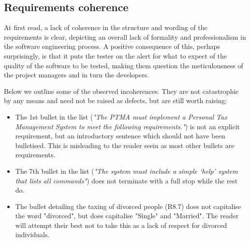 \subsection{Requirements coherence}
At first read, a lack of coherence in the structure and wording of the requirements is clear, depicting an overall lack of formality and professionalism in the software engineering process. 
A positive consequence of this, perhaps surprisingly, is that it puts the tester on the alert for what to expect of the quality of the software to be tested, making them question the meticulousness of the project managers and in turn the developers.
\par
Below we outline some of the observed incoherences. They are not catastrophic by any means and need not be raised as defects, but are still worth raising:
\begin{itemize}
	\item The 1st bullet in the list (\textit{"The PTMA must implement a Personal Tax Management System to meet the following requirements."}) is not an explicit requirement, but an introductory sentence which should not have been bulletised. This is misleading to the reader seein as most other bullets are requirements. 
	\item The 7th bullet in the list (\textit{"The system must include a simple ‘help’ system that lists all commands"}) does not terminate with a full stop while the rest do. 
	\item The bullet detailing the taxing of divorced people (R8.7) does not capitalise the word "divorced", but does capitalise "Single" and "Married". The reader will attempt their best not to take this as a lack of respect for divorced individuals. 
\end{itemize}

